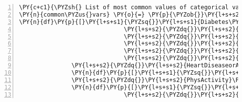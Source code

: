 \documentclass[12pt]{article}
\begin{document}
\begin{Verbatim}[commandchars=\\\{\},numbers=left,firstnumber=1,stepnumber=1,formatcom=\footnotesize]
\PY{c+c1}{\PYZsh{} List of most common values of categorical variables}
\PY{n}{common\PYZus{}vars} \PY{o}{=} \PY{p}{\PYZob{}}\PY{l+s+s2}{\PYZdq{}}\PY{l+s+s2}{Diabetes\PYZus{}binary}\PY{l+s+s2}{\PYZdq{}}\PY{p}{:} \PYZbs{}
\PY{n}{df}\PY{p}{[}\PY{l+s+s1}{\PYZsq{}}\PY{l+s+s1}{Diabetes\PYZus{}binary}\PY{l+s+s1}{\PYZsq{}}\PY{p}{]}\PY{o}{.}\PY{n}{value\PYZus{}counts}\PY{p}{(}\PY{p}{)}\PY{o}{.}\PY{n}{idxmax}\PY{p}{(}\PY{p}{)}\PY{p}{,}
                              \PY{l+s+s2}{\PYZdq{}}\PY{l+s+s2}{HighBP}\PY{l+s+s2}{\PYZdq{}}\PY{p}{:} \PY{n}{df}\PY{p}{[}\PY{l+s+s1}{\PYZsq{}}\PY{l+s+s1}{HighBP}\PY{l+s+s1}{\PYZsq{}}\PY{p}{]}\PY{o}{.}\PY{n}{value\PYZus{}counts}\PY{p}{(}\PY{p}{)}\PY{o}{.}\PY{n}{idxmax}\PY{p}{(}\PY{p}{)}\PY{p}{,}
                              \PY{l+s+s2}{\PYZdq{}}\PY{l+s+s2}{HighChol}\PY{l+s+s2}{\PYZdq{}}\PY{p}{:} \PY{n}{df}\PY{p}{[}\PY{l+s+s1}{\PYZsq{}}\PY{l+s+s1}{HighChol}\PY{l+s+s1}{\PYZsq{}}\PY{p}{]}\PY{o}{.}\PY{n}{value\PYZus{}counts}\PY{p}{(}\PY{p}{)}\PY{o}{.}\PY{n}{idxmax}\PY{p}{(}\PY{p}{)}\PY{p}{,}
                              \PY{l+s+s2}{\PYZdq{}}\PY{l+s+s2}{CholCheck}\PY{l+s+s2}{\PYZdq{}}\PY{p}{:} \PY{n}{df}\PY{p}{[}\PY{l+s+s1}{\PYZsq{}}\PY{l+s+s1}{CholCheck}\PY{l+s+s1}{\PYZsq{}}\PY{p}{]}\PY{o}{.}\PY{n}{value\PYZus{}counts}\PY{p}{(}\PY{p}{)}\PY{o}{.}\PY{n}{idxmax}\PY{p}{(}\PY{p}{)}\PY{p}{,}
                              \PY{l+s+s2}{\PYZdq{}}\PY{l+s+s2}{Smoker}\PY{l+s+s2}{\PYZdq{}}\PY{p}{:} \PY{n}{df}\PY{p}{[}\PY{l+s+s1}{\PYZsq{}}\PY{l+s+s1}{Smoker}\PY{l+s+s1}{\PYZsq{}}\PY{p}{]}\PY{o}{.}\PY{n}{value\PYZus{}counts}\PY{p}{(}\PY{p}{)}\PY{o}{.}\PY{n}{idxmax}\PY{p}{(}\PY{p}{)}\PY{p}{,}
                              \PY{l+s+s2}{\PYZdq{}}\PY{l+s+s2}{Stroke}\PY{l+s+s2}{\PYZdq{}}\PY{p}{:} \PY{n}{df}\PY{p}{[}\PY{l+s+s1}{\PYZsq{}}\PY{l+s+s1}{Stroke}\PY{l+s+s1}{\PYZsq{}}\PY{p}{]}\PY{o}{.}\PY{n}{value\PYZus{}counts}\PY{p}{(}\PY{p}{)}\PY{o}{.}\PY{n}{idxmax}\PY{p}{(}\PY{p}{)}\PY{p}{,}
               \PY{l+s+s2}{\PYZdq{}}\PY{l+s+s2}{HeartDiseaseorAttack}\PY{l+s+s2}{\PYZdq{}}\PY{p}{:} \PYZbs{}
               \PY{n}{df}\PY{p}{[}\PY{l+s+s1}{\PYZsq{}}\PY{l+s+s1}{HeartDiseaseorAttack}\PY{l+s+s1}{\PYZsq{}}\PY{p}{]}\PY{o}{.}\PY{n}{value\PYZus{}counts}\PY{p}{(}\PY{p}{)}\PY{o}{.}\PY{n}{idxmax}\PY{p}{(}\PY{p}{)}\PY{p}{,}
               \PY{l+s+s2}{\PYZdq{}}\PY{l+s+s2}{PhysActivity}\PY{l+s+s2}{\PYZdq{}}\PY{p}{:} \PYZbs{}
               \PY{n}{df}\PY{p}{[}\PY{l+s+s1}{\PYZsq{}}\PY{l+s+s1}{PhysActivity}\PY{l+s+s1}{\PYZsq{}}\PY{p}{]}\PY{o}{.}\PY{n}{value\PYZus{}counts}\PY{p}{(}\PY{p}{)}\PY{o}{.}\PY{n}{idxmax}\PY{p}{(}\PY{p}{)}\PY{p}{,}
                              \PY{l+s+s2}{\PYZdq{}}\PY{l+s+s2}{Fruits}\PY{l+s+s2}{\PYZdq{}}\PY{p}{:} \PY{n}{df}\PY{p}{[}\PY{l+s+s1}{\PYZsq{}}\PY{l+s+s1}{Fruits}\PY{l+s+s1}{\PYZsq{}}\PY{p}{]}\PY{o}{.}\PY{n}{value\PYZus{}counts}\PY{p}{(}\PY{p}{)}\PY{o}{.}\PY{n}{idxmax}\PY{p}{(}\PY{p}{)}\PY{p}{,}

\end{Verbatim}
\end{document}
